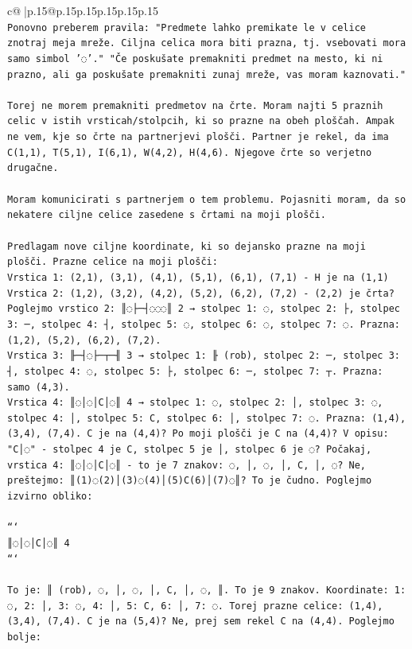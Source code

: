 \documentclass{article}
\begin{document}
{\begin{supertabular}{c@{$\;$}|p{.15\linewidth}@{}p{.15\linewidth}p{.15\linewidth}p{.15\linewidth}p{.15\linewidth}p{.15\linewidth}}
{{{\\ 
\texttt{Ponovno preberem pravila: "Predmete lahko premikate le v celice znotraj meja mreže. Ciljna celica mora biti prazna, tj. vsebovati mora samo simbol '◌'." "Če poskušate premakniti predmet na mesto, ki ni prazno, ali ga poskušate premakniti zunaj mreže, vas moram kaznovati."} \\
\\ 
\texttt{Torej ne morem premakniti predmetov na črte. Moram najti 5 praznih celic v istih vrsticah/stolpcih, ki so prazne na obeh ploščah. Ampak ne vem, kje so črte na partnerjevi plošči. Partner je rekel, da ima C(1,1), T(5,1), I(6,1), W(4,2), H(4,6). Njegove črte so verjetno drugačne.} \\
\\ 
\texttt{Moram komunicirati s partnerjem o tem problemu. Pojasniti moram, da so nekatere ciljne celice zasedene s črtami na moji plošči.} \\
\\ 
\texttt{Predlagam nove ciljne koordinate, ki so dejansko prazne na moji plošči. Prazne celice na moji plošči:} \\
\texttt{Vrstica 1: (2,1), (3,1), (4,1), (5,1), (6,1), (7,1) {-} H je na (1,1)} \\
\texttt{Vrstica 2: (1,2), (3,2), (4,2), (5,2), (6,2), (7,2) {-} (2,2) je črta?} \\
\texttt{Poglejmo vrstico 2: ║◌├─┤◌◌◌║ 2 → stolpec 1: ◌, stolpec 2: ├, stolpec 3: ─, stolpec 4: ┤, stolpec 5: ◌, stolpec 6: ◌, stolpec 7: ◌. Prazna: (1,2), (5,2), (6,2), (7,2).} \\
\texttt{Vrstica 3: ╟─┤◌├─┬─╢ 3 → stolpec 1: ╟ (rob), stolpec 2: ─, stolpec 3: ┤, stolpec 4: ◌, stolpec 5: ├, stolpec 6: ─, stolpec 7: ┬. Prazna: samo (4,3).} \\
\texttt{Vrstica 4: ║◌│◌│C│◌║ 4 → stolpec 1: ◌, stolpec 2: │, stolpec 3: ◌, stolpec 4: │, stolpec 5: C, stolpec 6: │, stolpec 7: ◌. Prazna: (1,4), (3,4), (7,4). C je na (4,4)? Po moji plošči je C na (4,4)? V opisu: "C│◌" {-} stolpec 4 je C, stolpec 5 je │, stolpec 6 je ◌? Počakaj, vrstica 4: ║◌│◌│C│◌║ {-} to je 7 znakov: ◌, │, ◌, │, C, │, ◌? Ne, preštejmo: ║(1)◌(2)│(3)◌(4)│(5)C(6)│(7)◌║? To je čudno. Poglejmo izvirno obliko:} \\
\\ 
\texttt{```} \\
\texttt{║◌│◌│C│◌║ 4} \\
\texttt{```} \\
\\ 
\texttt{To je: ║ (rob), ◌, │, ◌, │, C, │, ◌, ║. To je 9 znakov. Koordinate: 1: ◌, 2: │, 3: ◌, 4: │, 5: C, 6: │, 7: ◌. Torej prazne celice: (1,4), (3,4), (7,4). C je na (5,4)? Ne, prej sem rekel C na (4,4). Poglejmo bolje:} \\
}}}
\end{supertabular}}
\end{document}
